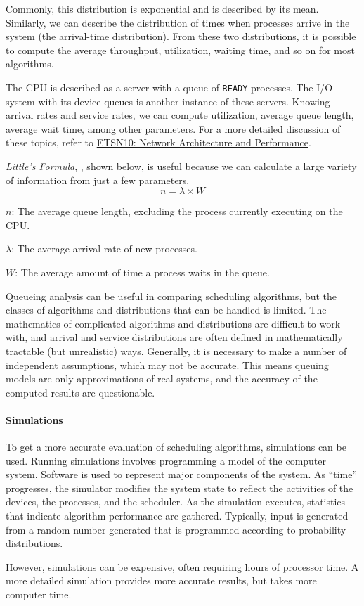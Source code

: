 Commonly, this distribution is exponential and is described by its mean.
Similarly, we can describe the distribution of times when processes arrive in
the system (the arrival-time distribution). From these two distributions, it is
possible to compute the average throughput, utilization, waiting time, and so
on for most algorithms.

The CPU is described as a server with a queue of \texttt{READY} processes.
The I/O system with its device queues is another instance of these servers.
Knowing arrival rates and service rates, we can compute utilization, average queue length, average wait time, among other parameters.
For a more detailed discussion of these topics, refer to \href{file:./ETSN10-Network_Architecture_Performance-Reference_Material.pdf}{ETSN10: Network Architecture and Performance}.

\emph{Little's Formula}, , shown below, is useful because we can calculate a large variety of information from just a few parameters.
\begin{equation}\label{eq:Littles_Law}
  n = \lambda \times W
\end{equation}
\begin{description}[noitemsep]
\item $n$: The average queue length, excluding the process currently executing on the CPU.\@
\item $\lambda$: The average arrival rate of new processes.
\item $W$: The average amount of time a process waits in the queue.
\end{description}

Queueing analysis can be useful in comparing scheduling algorithms, but the classes of algorithms and distributions that can be handled is limited.
The mathematics of complicated algorithms and distributions are difficult to work with, and arrival and service distributions are often defined in mathematically tractable (but unrealistic) ways.
Generally, it is necessary to make a number of independent assumptions, which may not be accurate.
This means queuing models are only approximations of real systems, and the accuracy of the computed results are questionable.

\paragraph{Simulations}\label{par:Simulations}
To get a more accurate evaluation of scheduling algorithms, simulations can be used.
Running simulations involves programming a model of the computer system.
Software is used to represent major components of the system.
As ``time'' progresses, the simulator modifies the system state to reflect the activities of the devices, the processes, and the scheduler.
As the simulation executes, statistics that indicate algorithm performance are gathered.
Typically, input is generated from a random-number generated that is programmed according to probability distributions.

However, simulations can be expensive, often requiring hours of processor time.
A more detailed simulation provides more accurate results, but takes more computer time.


